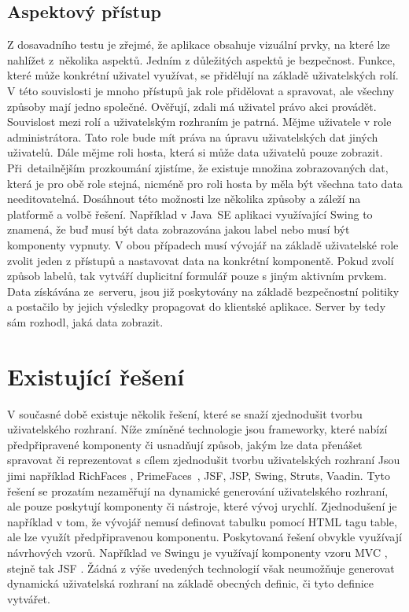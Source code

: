 \subsection{Aspektový přístup}
Z dosavadního testu je zřejmé, že aplikace obsahuje vizuální prvky, na které lze nahlížet z~několika aspektů. Jedním z důležitých aspektů je bezpečnost. Funkce, které může konkrétní uživatel využívat, se přidělují na základě uživatelských rolí. V této souvislosti je mnoho přístupů jak role přidělovat a spravovat, ale všechny způsoby mají jedno společné. Ověřují, zdali má uživatel právo akci provádět. Souvislost mezi rolí a uživatelským rozhraním je patrná. Mějme uživatele v role administrátora. Tato role bude mít práva na úpravu uživatelských dat jiných uživatelů. Dále mějme roli hosta, která si může data uživatelů pouze zobrazit. Při~detailnějším prozkoumání zjistíme, že existuje množina zobrazovaných dat, která je pro obě role stejná, nicméně pro roli hosta by měla být všechna tato data needitovatelná. Dosáhnout této možnosti lze několika způsoby a záleží na platformě a volbě řešení. Například v Java~SE aplikaci využívající Swing to znamená, že buď musí být data zobrazována jakou label nebo musí být komponenty vypnuty. V obou případech musí vývojář na základě uživatelské role zvolit jeden z přístupů a nastavovat data na konkrétní komponentě. Pokud zvolí způsob labelů, tak vytváří duplicitní formulář pouze s jiným aktivním prvkem. Data získávána ze~serveru, jsou již poskytovány na základě bezpečnostní politiky a postačilo by jejich výsledky propagovat do klientské aplikace. Server by tedy sám rozhodl, jaká data zobrazit.
\section{Existující řešení}
V současné době existuje několik řešení, které se snaží zjednodušit tvorbu uživatelského rozhraní. Níže zmíněné technologie jsou frameworky, které nabízí předpřipravené komponenty či usnadňují způsob, jakým lze data přenášet spravovat či reprezentovat s cílem zjednodušit tvorbu uživatelských rozhraní Jsou jimi například RichFaces \cite{richfaces}, PrimeFaces~\cite{primefaces}, JSF, JSP, Swing, Struts, Vaadin. Tyto řešení se prozatím nezaměřují na dynamické generování uživatelského rozhraní, ale pouze poskytují komponenty či nástroje, které vývoj urychlí. Zjednodušení je například v tom, že vývojář nemusí definovat tabulku pomocí HTML tagu table, ale lze využít předpřipravenou komponentu. Poskytovaná řešení obvykle využívají návrhových vzorů. Například ve Swingu je využívají komponenty vzoru MVC \cite{fowler}, stejně tak JSF \cite{javaEETutorial}. Žádná z výše uvedených technologií však neumožňuje generovat dynamická uživatelská rozhraní na základě obecných definic, či tyto definice vytvářet.
